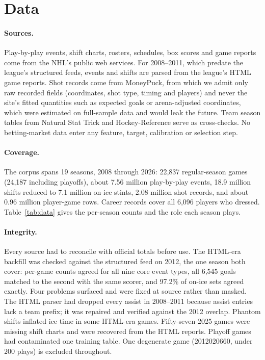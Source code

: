\section{Data}
\label{sec:data}

\paragraph{Sources.}
Play-by-play events, shift charts, rosters, schedules, box scores and game
reports come from the NHL's public web services. For 2008--2011, which predate
the league's structured feeds, events and shifts are parsed from the league's
HTML game reports. Shot records come from MoneyPuck, from which we admit only
raw recorded fields (coordinates, shot type, timing and players) and never the
site's fitted quantities such as expected goals or arena-adjusted
coordinates, which were estimated on full-sample data and would leak the
future. Team season tables from Natural Stat Trick and Hockey-Reference serve
as cross-checks. No betting-market data enter any feature, target,
calibration or selection step.

\paragraph{Coverage.}
The corpus spans 19 seasons, 2008 through 2026: 22,837 regular-season games
(24,187 including playoffs), about 7.56 million play-by-play events, 18.9
million shifts reduced to 7.1 million on-ice stints, 2.08 million shot
records, and about 0.96 million player-game rows. Career records cover all
6,096 players who dressed. Table~\ref{tab:data} gives the per-season counts
and the role each season plays.

\paragraph{Integrity.}
Every source had to reconcile with official totals before use. The HTML-era
backfill was checked against the structured feed on 2012, the one season both
cover: per-game counts agreed for all nine core event types, all 6,545 goals
matched to the second with the same scorer, and 97.2\% of on-ice sets agreed
exactly. Four problems surfaced and were fixed at source rather than masked.
The HTML parser had dropped every assist in 2008--2011 because assist entries
lack a team prefix; it was repaired and verified against the 2012 overlap.
Phantom shifts inflated ice time in some HTML-era games. Fifty-seven 2025
games were missing shift charts and were recovered from the HTML reports.
Playoff games had contaminated one training table. One degenerate game
(2012020660, under 200 plays) is excluded throughout.

